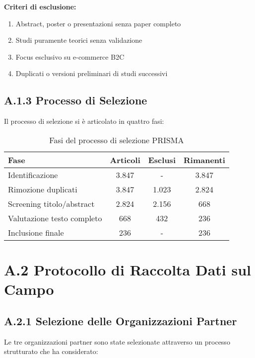 \textbf{Criteri di esclusione:}
\begin{enumerate}
    \item Abstract, poster o presentazioni senza paper completo
    \item Studi puramente teorici senza validazione
    \item Focus esclusivo su e-commerce B2C
    \item Duplicati o versioni preliminari di studi successivi
\end{enumerate}

\subsection{A.1.3 Processo di Selezione}

Il processo di selezione si è articolato in quattro fasi:

\begin{table}[htbp]
\centering
\caption{Fasi del processo di selezione PRISMA}
\begin{tabular}{|l|c|c|c|}
\hline
\textbf{Fase} & \textbf{Articoli} & \textbf{Esclusi} & \textbf{Rimanenti} \\
\hline
Identificazione & 3.847 & - & 3.847 \\
Rimozione duplicati & 3.847 & 1.023 & 2.824 \\
Screening titolo/abstract & 2.824 & 2.156 & 668 \\
Valutazione testo completo & 668 & 432 & 236 \\
Inclusione finale & 236 & - & 236 \\
\hline
\end{tabular}
\end{table}

\section{A.2 Protocollo di Raccolta Dati sul Campo}

\subsection{A.2.1 Selezione delle Organizzazioni Partner}

Le tre organizzazioni partner sono state selezionate attraverso un processo strutturato che ha considerato:

